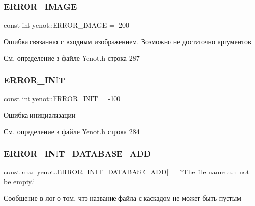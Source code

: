 \subsubsection{\texorpdfstring{E\+R\+R\+O\+R\+\_\+\+I\+M\+A\+GE}{ERROR\_IMAGE}}
{\footnotesize\ttfamily const int yenot\+::\+E\+R\+R\+O\+R\+\_\+\+I\+M\+A\+GE = -\/200}



Ошибка связанная с входным изображением. Возможно не достаточно аргументов 



См. определение в файле Yenot.\+h строка 287

\mbox{\label{namespaceyenot_a8206ed93e65c9e89395c2823a5f18786}} 
\subsubsection{\texorpdfstring{E\+R\+R\+O\+R\+\_\+\+I\+N\+IT}{ERROR\_INIT}}
{\footnotesize\ttfamily const int yenot\+::\+E\+R\+R\+O\+R\+\_\+\+I\+N\+IT = -\/100}



Ошибка инициализации 



См. определение в файле Yenot.\+h строка 284

\mbox{\label{namespaceyenot_af958287fcf5b41e632a87bd1a795c74b}} 
\subsubsection{\texorpdfstring{E\+R\+R\+O\+R\+\_\+\+I\+N\+I\+T\+\_\+\+D\+A\+T\+A\+B\+A\+S\+E\+\_\+\+A\+DD}{ERROR\_INIT\_DATABASE\_ADD}}
{\footnotesize\ttfamily const char yenot\+::\+E\+R\+R\+O\+R\+\_\+\+I\+N\+I\+T\+\_\+\+D\+A\+T\+A\+B\+A\+S\+E\+\_\+\+A\+DD\mbox{[}$\,$\mbox{]} = \char`\"{}The file name can not be empty.\char`\"{}}



Сообщение в лог о том, что название файла с каскадом не может быть пустым 



